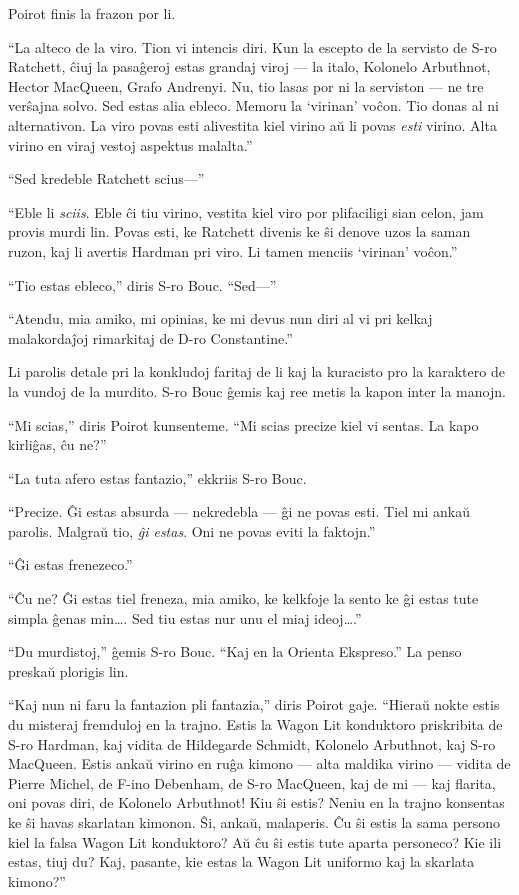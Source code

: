 Poirot finis la frazon por li.

``La alteco de la viro. Tion vi intencis diri. Kun la escepto de la servisto de S-ro Ratchett, ĉiuj la pasaĝeroj estas grandaj viroj --- la italo, Kolonelo Arbuthnot, Hector MacQueen, Grafo Andrenyi. Nu, tio lasas por ni la serviston --- ne tre verŝajna solvo. Sed estas alia ebleco. Memoru la `virinan' voĉon. Tio donas al ni alternativon. La viro povas esti alivestita kiel virino aŭ li povas \emph{esti} virino. Alta virino en viraj vestoj aspektus malalta.''

``Sed kredeble Ratchett scius---''

``Eble li \emph{sciis}. Eble ĉi tiu virino, vestita kiel viro por plifaciligi sian celon, jam provis murdi lin. Povas esti, ke Ratchett divenis ke ŝi denove uzos la saman ruzon, kaj li avertis Hardman pri viro. Li tamen menciis `virinan' voĉon.''

``Tio estas ebleco,'' diris S-ro Bouc. ``Sed---''

``Atendu, mia amiko, mi opinias, ke mi devus nun diri al vi pri kelkaj malakordaĵoj rimarkitaj de D-ro Constantine.''

Li parolis detale pri la konkludoj faritaj de li kaj la kuracisto pro la karaktero de la vundoj de la murdito. S-ro Bouc ĝemis kaj ree metis la kapon inter la manojn.

``Mi scias,'' diris Poirot kunsenteme. ``Mi scias precize kiel vi sentas. La kapo kirliĝas, ĉu ne?''

``La tuta afero estas fantazio,'' ekkriis S-ro Bouc.

``Precize. Ĝi estas absurda --- nekredebla --- ĝi ne povas esti. Tiel mi ankaŭ parolis. Malgraŭ tio, \emph{ĝi estas}. Oni ne povas eviti la faktojn.''

``Ĝi estas frenezeco.''

``Ĉu ne? Ĝi estas tiel freneza, mia amiko, ke kelkfoje la sento ke ĝi estas tute simpla ĝenas min{\ldots}. Sed tiu estas nur unu el miaj ideoj{\ldots}.''

``Du murdistoj,'' ĝemis S-ro Bouc. ``Kaj en la Orienta Ekspreso.'' La penso preskaŭ plorigis lin.

``Kaj nun ni faru la fantazion pli fantazia,'' diris Poirot gaje. ``Hieraŭ nokte estis du misteraj fremduloj en la trajno. Estis la Wagon Lit konduktoro priskribita de S-ro Hardman, kaj vidita de Hildegarde Schmidt, Kolonelo Arbuthnot, kaj S-ro MacQueen. Estis ankaŭ virino en ruĝa kimono --- alta maldika virino --- vidita de Pierre Michel, de F-ino Debenham, de S-ro MacQueen, kaj de mi --- kaj flarita, oni povas diri, de Kolonelo Arbuthnot! Kiu ŝi estis? Neniu en la trajno konsentas ke ŝi havas skarlatan kimonon. Ŝi, ankaŭ, malaperis. Ĉu ŝi estis la sama persono kiel la falsa Wagon Lit konduktoro? Aŭ ĉu ŝi estis tute aparta personeco? Kie ili estas, tiuj du? Kaj, pasante, kie estas la Wagon Lit uniformo kaj la skarlata kimono?''

